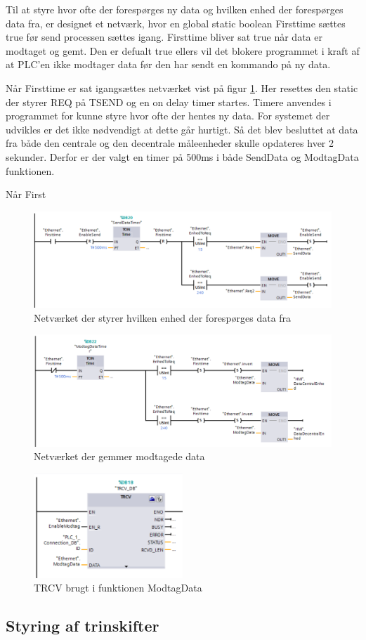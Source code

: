 Til at styre hvor ofte der forespørges ny data og hvilken enhed der forespørges data fra, er designet et netværk, hvor en global static boolean Firsttime sættes true før send processen sættes igang. Firsttime bliver sat true når data er modtaget og gemt. Den er defualt true ellers vil det blokere programmet i kraft af at PLC'en ikke modtager data før den har sendt en kommando på ny data.

Når Firsttime er sat igangsættes netværket vist på figur \ref{fig:ValgAfEnhedSend}. Her resettes den static der styrer REQ på TSEND og en on delay timer startes. Timere anvendes i programmet for kunne styre hvor ofte der hentes ny data. For systemet der udvikles er det ikke nødvendigt at dette går hurtigt. Så det blev besluttet at data fra både den centrale og den decentrale måleenheder skulle opdateres hver 2 sekunder. Derfor er der valgt en timer på 500ms i både SendData og ModtagData funktionen.

Når First

\begin{figure}[H] %
	\centering
	\includegraphics[width=1\textwidth]{Figure/valgAfEnhedSend}
	\caption{Netværket der styrer hvilken enhed der forespørges data fra}
	\label{fig:ValgAfEnhedSend}
\end{figure}

\begin{figure}[H] %
	\centering
	\includegraphics[width=1\textwidth]{Figure/GemModtagetData}
	\caption{Netværket der gemmer modtagede data}
	\label{fig:TSEND}
\end{figure}

\begin{figure}[H] %
	\centering
	\includegraphics[width=0.5\textwidth]{Figure/TRCV}
	\caption{TRCV brugt i funktionen ModtagData}
	\label{fig:TRCV}
\end{figure}


\subsection{Styring af trinskifter}